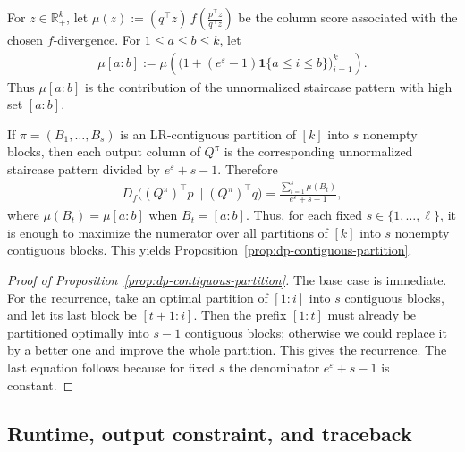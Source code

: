 \documentclass{article}
\theoremstyle{plain}
\theoremstyle{definition}
\theoremstyle{plain}
\begin{document}
For $z\in\mathbb{R}_+^k$, let $\displaystyle \mu(z):=(q^\top z)\,f\!\left(\frac{p^\top z}{q^\top z}\right)$ be the column score associated with the chosen $f$-divergence. For $1\le a\le b\le k$, let
\begin{align}
    \mu[a:b]
    :=
    \mu\!\left(
        \bigl(1+(e^\varepsilon-1)\mathbf{1}\{a\le i\le b\}\bigr)_{i=1}^k
    \right).
\end{align}
Thus $\mu[a:b]$ is the contribution of the unnormalized staircase pattern with high set $[a:b]$.

If $\pi=(B_1,\dots,B_s)$ is an LR-contiguous partition of $[k]$ into $s$ nonempty blocks, then each output column of $Q^\pi$ is the corresponding unnormalized staircase pattern divided by $e^\varepsilon+s-1$. Therefore
\begin{align}
    D_f\bigl((Q^\pi)^\top p\|(Q^\pi)^\top q\bigr)
    =
    \frac{\sum_{t=1}^s \mu(B_t)}{e^\varepsilon+s-1},
\end{align}
where $\mu(B_t)=\mu[a:b]$ when $B_t=[a:b]$. Thus, for each fixed $s\in\{1,\dots,\ell\}$, it is enough to maximize the numerator over all partitions of $[k]$ into $s$ nonempty contiguous blocks. This yields Proposition~\ref{prop:dp-contiguous-partition}.

\begin{proof}[Proof of Proposition~\ref{prop:dp-contiguous-partition}]
The base case is immediate. For the recurrence, take an optimal partition of $[1:i]$ into $s$ contiguous blocks, and let its last block be $[t+1:i]$. Then the prefix $[1:t]$ must already be partitioned optimally into $s-1$ contiguous blocks; otherwise we could replace it by a better one and improve the whole partition. This gives the recurrence. The last equation follows because for fixed $s$ the denominator $e^\varepsilon+s-1$ is constant.
\end{proof}

\subsection{Runtime, output constraint, and traceback}
\label{sec:dp-runtime-traceback}
\end{document}

